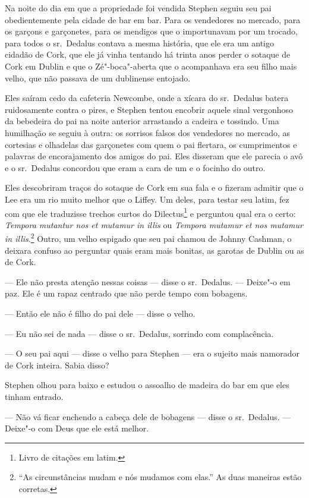 Na noite do dia em que a propriedade foi vendida Stephen seguiu seu pai
obedientemente pela cidade de bar em bar. Para os vendedores no
mercado, para os garçons e garçonetes, para os mendigos que o
importunavam por um trocado, para todos o sr.~Dedalus contava a mesma
história, que ele era um antigo cidadão de Cork, que ele já vinha
tentando há trinta anos perder o sotaque de Cork em Dublin e que o
Zé"-boca"-aberta que o acompanhava era seu filho mais velho, que não
passava de um dublinense entojado.

Eles saíram cedo da cafeteria Newcombe, onde a xícara do sr.~Dedalus
batera ruidosamente contra o pires, e Stephen tentou encobrir aquele
sinal vergonhoso da bebedeira do pai na noite anterior arrastando a
cadeira e tossindo. Uma humilhação se seguiu à outra: os sorrisos
falsos dos vendedores no mercado, as cortesias e olhadelas das
garçonetes com quem o pai flertara, os cumprimentos e palavras de
encorajamento dos amigos do pai. Eles disseram que ele parecia o avô e
o sr.~Dedalus concordou que eram a cara de um e o focinho do outro.

Eles descobriram traços do sotaque de Cork em sua fala e o fizeram
admitir que o Lee era um rio muito melhor 
que o Liffey. Um deles, para testar seu latim, fez com que ele
traduzisse trechos curtos do Dilectus\footnote{ Livro de citações em
latim.} e perguntou qual era o certo: \textit{Tempora mutantur nos et
mutamur in illis} ou \textit{Tempora mutamur et nos mutamur in
illis}.\footnote{ “As circunstâncias mudam e nós mudamos com elas.” As
duas maneiras estão corretas.} Outro, um velho espigado que seu pai
chamou de Johnny Cashman, o deixara confuso ao perguntar quais eram
mais bonitas, as garotas de Dublin ou as de Cork.

 --- Ele não presta atenção nessas coisas --- disse o sr.~Dedalus. --- Deixe"-o em
paz. Ele é um rapaz centrado que não perde tempo com bobagens.

 --- Então ele não é filho do pai dele --- disse o velho.

 --- Eu não sei de nada --- disse o sr.~Dedalus, sorrindo com complacência.

 --- O seu pai aqui --- disse o velho para Stephen --- era o sujeito mais
namorador de Cork inteira. Sabia disso?

Stephen olhou para baixo e estudou o assoalho de madeira do bar em que
eles tinham entrado.

 --- Não vá ficar enchendo a cabeça dele de bobagens --- disse o sr.~Dedalus. --- Deixe"-o com Deus que ele está melhor.

